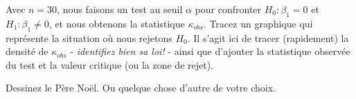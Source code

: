 \begin{questions}

\pageblanche
\bonusquestion[2] Avec $n=30$, nous faisons un test au seuil $\alpha$ pour confronter $H_0:\beta_1=0$ et $H_1:\beta_1\neq0$, et nous obtenons la statistique $\kappa_{obs}$. Tracez un graphique qui représente la situation où nous rejetons $H_0$. Il s'agit ici de tracer (rapidement) la densité de $\kappa_{obs}$ - \textit{identifiez bien sa loi!} - ainsi que d'ajouter la statistique observée du test et la valeur critique (ou la zone de rejet).

\vspace{10cm}
\bonusquestion[2] Dessinez le Père Noël. Ou quelque chose d'autre de votre choix. 







\end{questions}

 
